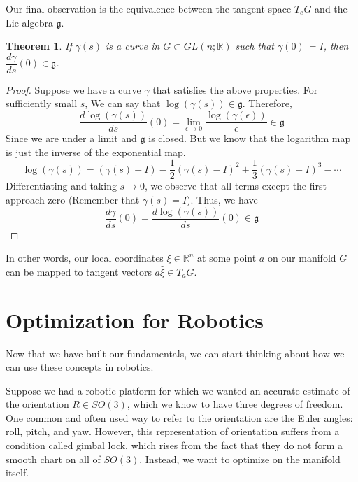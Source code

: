 \documentclass[reqno]{amsart}
\newtheorem{thm}{Theorem}[section]
\theoremstyle{definition}
\numberwithin{equation}{section}
\begin{document}
 Our final observation is the equivalence between the tangent space $T_eG$ and the Lie algebra $\mathfrak{g}$.

 \begin{thm}
     If $\gamma(s)$ is a curve in $G \subset GL(n; \mathbb{R})$ such that $\gamma(0)$ = $I$, then $\dfrac{d\gamma}{ds}(0) \in \mathfrak{g}$.
 \end{thm}
 \begin{proof}
     Suppose we have a curve $\gamma$ that satisfies the above properties. For sufficiently small $s$, We can say that $\log(\gamma(s)) \in \mathfrak{g}$. Therefore,
     \begin{equation*}
         \frac{d\log(\gamma(s))}{ds}(0) = \lim_{\epsilon \to 0}\frac{\log(\gamma(\epsilon))}{\epsilon} \in \mathfrak{g}
     \end{equation*} 
     Since we are under a limit and $\mathfrak{g}$ is closed. But we know that the logarithm map is just the inverse of the exponential map.
     \begin{equation*}
         \log(\gamma(s)) = (\gamma(s) - I) - \frac{1}{2}(\gamma(s) - I)^2 + \frac{1}{3}(\gamma(s) - I)^3 - \cdots
     \end{equation*}
     Differentiating and taking $s \to 0$, we observe that all terms except the first approach zero (Remember that $\gamma(s) = I$). Thus, we have
     \begin{equation*}
         \frac{d\gamma}{ds}(0) = \frac{d\log(\gamma(s))}{ds}(0) \in \mathfrak{g}
     \end{equation*}
 \end{proof}

 In other words, our local coordinates $\xi \in \mathbb{R}^n$ at some point $a$ on our manifold $G$ can be mapped to tangent vectors $a\hat\xi \in T_aG.$

\section{Optimization for Robotics}

Now that we have built our fundamentals, we can start thinking about how we can use these concepts in robotics.

Suppose we had a robotic platform for which we wanted an accurate estimate of the orientation $R \in SO(3)$, which we know to have three degrees of freedom. One common and often used way to refer to the orientation are the Euler angles: roll, pitch, and yaw. However, this representation of orientation suffers from a condition called gimbal lock, which rises from the fact that they do not form a smooth chart on all of $SO(3)$. Instead, we want to optimize on the manifold itself.
\end{document}
